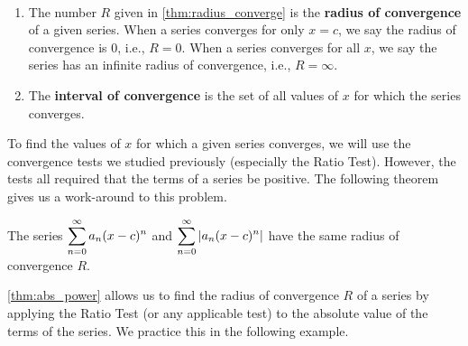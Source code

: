 \begin{definition}\label{def:radius_converge}%
\mbox{}\\[-2\baselineskip]
\begin{enumerate}
	\item The number $R$ given in \autoref{thm:radius_converge} is the \textbf{radius of convergence} of a given series. When a series converges for only $x=c$, we say the radius of convergence is 0, i.e.,  $R=0$. When a series converges for all $x$, we say the series has an infinite radius of convergence, i.e., $R=\infty$.
	\item	The \textbf{interval of convergence} is the set of all values of $x$ for which the series converges.
\end{enumerate}
\end{definition}

To find the values of $x$ for which a given series converges, we will use the convergence tests we studied previously (especially the Ratio Test). However, the tests all required that the terms of a series be positive. The following theorem gives us a work-around to this problem.

\begin{theorem}\label{thm:abs_power}%
	The series $\displaystyle \sum_{n=0}^\infty a_n(x-c)^n$ and $\displaystyle \sum_{n=0}^\infty \left\lvert a_n(x-c)^n \right\rvert$ have the same radius of convergence $R$.
\end{theorem}

\autoref{thm:abs_power} allows us to find the radius of convergence $R$ of a series by applying the Ratio Test (or any applicable test) to the absolute value of the terms of the series. We practice this in the following example.


